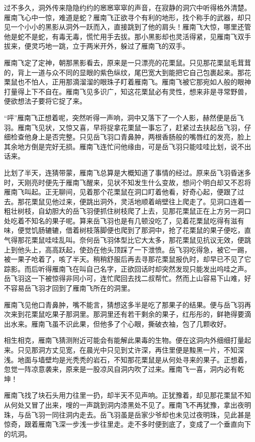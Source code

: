 过不多久，洞外传来隐隐约约的窸窸窣窣的声音，在寂静的洞穴中听得格外清楚。雁南飞心中一惊，难道是蛇？雁南飞正欲寻个有利的地形，找个称手的武器，却只见一个小小的黑影从洞外一跃而入，直接跳到了他的肩头！雁南飞大惊，哪里还管他是蛇不是蛇，有毒无毒，慌忙用手去拔。那小黑影却也灵活得紧，见雁南飞双手拔来，便灵巧地一跳，立于两米开外，躲过了雁南飞的双手。

雁南飞定了定神，朝那黑影看去，原来是一只漂亮的花栗鼠。只见那花栗鼠毛茸茸的，背上一道与众不同的显眼的紫色纵纹，尾巴宽大到能把它自己包裹起来。那花栗鼠也不怕人，正用那滴溜溜的眼珠子盯着雁南飞。雁南飞被它那宛如人般的眼神打量得上下不自在。雁南飞见多识广，知这花栗鼠必有灵性，想来非是寻常野兽，便欲想法子要将它捉了来。

“呯”雁南飞正想着呢，突然听得一声响，洞中又落下了一个人影，赫然便是岳飞羽。雁南飞见状，又惊又喜，早将捉拿花栗鼠一事忘了，赶紧过去扶起岳飞羽，仔细检查他身上是否完整。只见岳飞羽口青鼻肿，两根香肠般的嘴唇红的发亮，脸上其余地方倒是完好无损。雁南飞连忙问他缘由，可是岳飞羽只能哇哇比划，说不出话来。

比划了半天，连猜带蒙，雁南飞总算是大概知道了事情的经过。原来岳飞羽昏迷多时，天刚亮时便先于雁南飞醒来，见状不知发生什么变故，想问个明白却又不忍将雁南飞叫起。正无聊间，见着那个花栗鼠在洞口盯着他看，好奇心起，便跟了过去。那花栗鼠见他过来，便跳出洞外，灵活地顺着峭壁往上爬走了。见洞口连着一粗壮树枝，自幼胆大的岳飞羽便抓住树枝爬了上去，见那花栗鼠正在上方另一洞口处吃着不知名的果子呢。算来岳飞羽也是有几顿没吃了，见着花栗鼠吃得有滋有味，便觉饥肠辘辘，借着树枝落脚便也爬到了那洞中，抢了花栗鼠的果子便吃，直气得那花栗鼠哇哇乱叫。奈何岳飞羽体型比它大太多，那花栗鼠见抗议无效，便跳上到他头上，高高跃起，使劲在他头顶踩了一下泄愤。岳飞羽吃得急，被它一踢，被一果子呛着了，咳了半天。稍稍舒服后再去寻那花栗鼠报仇时，却早已不见了它踪影。而后听得雁南飞在叫自己名字，正欲回话时却突然发现只能发出呜哇之声。岳飞羽这一下被惊得非同小可，连忙爬回去找二叔帮忙。然而上山容易下山难，好不容易岳飞羽才回到了雁南飞所在的洞里。

雁南飞见他口青鼻肿，嘴不能言，猜想这多半是吃了那果子的结果。便与岳飞羽再次来到花栗鼠吃果子那洞里。那洞里还有若干剩余的果子，红彤彤的，鲜艳得要滴出水来。雁南飞虽不识此果，但他多了个心眼，撕破衣袖，包了几颗收好。

相生相克，雁南飞猜测附近可能会有能解此果毒的生物。便在这洞内外细细打量起来。只见那洞方丈见宽，在晨光中只见到丈许深，再住里便是黢黑一片，不知深浅。地面与墙壁均是光秃秃的岩石，不知那花栗鼠是从何处寻来的果子。正想着，忽觉一阵凉意袭来，原来是一股凉风自洞内吹了过来。雁南飞一喜，洞内必有乾坤！

雁南飞找了块石头用力往里一扔，却半天不见声响。正犹豫着，却见那花栗鼠不知从何处又冒了出来，嗖的一声跳到洞内漆黑处不见了。雁南飞不再犹豫，拿出夜明珠，与岳飞羽一同往洞内走去。岳飞羽虽是岳家少爷却也未见过夜明珠，见此甚是惊奇，跟着雁南飞深一步浅一步往里走。走不多时便到底了，变成了一个垂直向下的坑洞。

